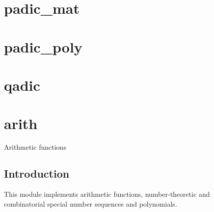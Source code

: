 \documentclass[a4paper,10pt]{book}
\begin{document}
{{


\chapter{padic\_mat}



\chapter{padic\_poly}



\chapter{qadic}



\chapter{arith}
\epigraph{Arithmetic functions}{}

\section{Introduction}

This module implements arithmetic functions, number-theoretic and
combinatorial special number sequences and polynomials.



}}
\end{document}
